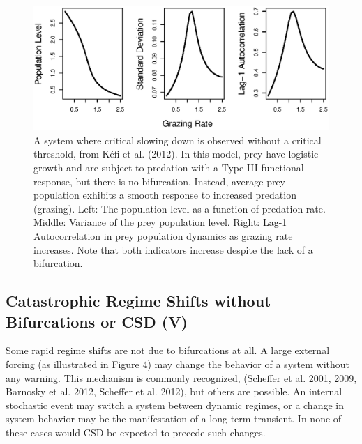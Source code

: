 \documentclass{article}
\begin{document}
\begin{figure}[htbp]
\centering
\includegraphics{kefi-fig.eps}
\caption{A system where critical slowing down is observed without a
critical threshold, from Kéfi et al. (2012). In this model, prey have
logistic growth and are subject to predation with a Type III functional
response, but there is no bifurcation. Instead, average prey population
exhibits a smooth response to increased predation (grazing). Left: The
population level as a function of predation rate. Middle: Variance of
the prey population level. Right: Lag-1 Autocorrelation in prey
population dynamics as grazing rate increases. Note that both indicators
increase despite the lack of a bifurcation.}
\end{figure}

\subsection{Catastrophic Regime Shifts without Bifurcations or CSD (V)}

Some rapid regime shifts are not due to bifurcations at all. A large
external forcing (as illustrated in Figure 4) may change the behavior of
a system without any warning. This mechanism is commonly recognized,
(Scheffer et al. 2001, 2009, Barnosky et al. 2012, Scheffer et al.
2012), but others are possible. An internal stochastic event may switch
a system between dynamic regimes, or a change in system behavior may be
the manifestation of a long-term transient. In none of these cases would
CSD be expected to precede such changes.
\end{document}
